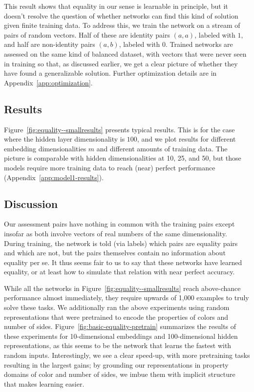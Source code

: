 \documentclass[9pt,twocolumn,twoside,lineno]{pnas-new}
\newcommand{\Figref}[1]{Figure~\ref{#1}}
\newcommand{\figref}[1]{Figure~\ref{#1}}
\newcommand{\appref}[1]{Appendix~\ref{#1}}
\newcommand{\update}[1]{{\color{darkblue}#1}}
\newcommand{\updatea}[1]{{\color{darkred}#1}}
\begin{document}
This result shows that equality in our sense is learnable in principle, but it doesn't resolve the question of whether networks can find this kind of solution given finite training data. To address this, we train the network on a stream of pairs of random vectors. Half of these are identity pairs $(a, a)$, labeled with $1$, and half are non-identity pairs $(a, b)$, labeled with $0$. Trained networks are assessed on the same kind of balanced dataset, with vectors that were never seen in training so that, as discussed earlier, we get a clear picture of whether they have found a generalizable solution.  Further optimization details are in \appref{app:optimization}.


\subsection*{Results}

\Figref{fig:equality--smallresults} presents typical results. This is for the case where the hidden layer dimensionality is $100$, and we plot results for different embedding dimensionalities $m$ and different amounts of training data. The picture is comparable with hidden dimensionalities at 10, 25, and 50, but those models require more training data to reach (near) perfect performance (\appref{app:model1-results}).


\subsection*{Discussion}

Our assessment pairs have nothing in common with the training pairs except insofar as both involve vectors of real numbers of the same dimensionality. During training, the network is told (via labels) which pairs are equality pairs and which are not, but the pairs themselves contain no information about equality per se. It thus seems fair to us to say that these networks have learned equality, or at least how to simulate that relation with near perfect accuracy.

\update{
While all the networks in \figref{fig:equality--smallresults} reach above-chance performance almost immediately, they require upwards of 1,000 examples to truly solve these tasks. \updatea{We additionally ran the above experiments using random representations that were pretrained to encode the properties of colors and number of sides. \Figref{fig:basic-equality-pretrain} summarizes the results of these experiments for 10-dimensional embeddings and 100-dimensional hidden representations, as this seems to be the network that learns the fastest with random inputs. Interestingly, we see a clear speed-up, with more pretraining tasks resulting in the largest gains; by grounding our representations in property domains of color and number of sides, we imbue them with implicit structure that makes learning easier.}}
\end{document}
